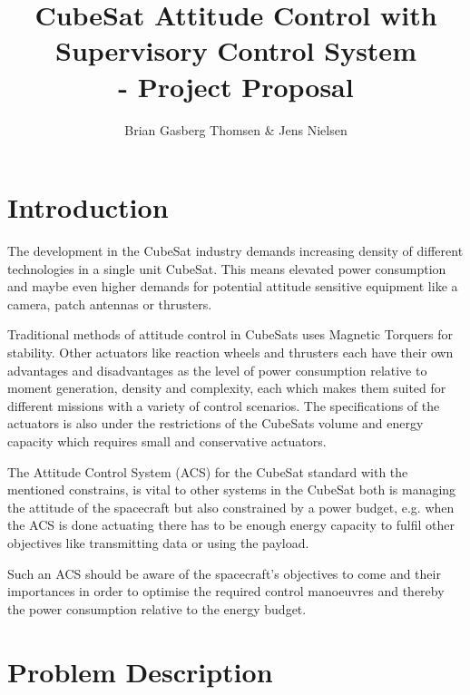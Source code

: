 \documentclass[10pt,a4paper,oneside,openany,article]{memoir}
\title{\vspace{-2cm} CubeSat Attitude Control with Supervisory Control System \\ \Large - Project Proposal}
\author{Brian Gasberg Thomsen \& Jens Nielsen}
\begin{document}
\maketitle

\chapter{Introduction}
The development in the CubeSat industry demands increasing density of different technologies in a single unit CubeSat. This means elevated power consumption and maybe even higher demands for potential attitude sensitive equipment like a camera, patch antennas or thrusters. 

Traditional methods of attitude control in CubeSats uses Magnetic Torquers for stability. Other actuators like reaction wheels and thrusters each have their own advantages and disadvantages as the level of power consumption relative to moment generation, density and complexity, each which makes them suited for different missions with a variety of control scenarios. The specifications of the actuators is also under the restrictions of the CubeSats volume and energy capacity which requires small and conservative actuators.

The Attitude Control System (ACS) for the CubeSat standard with the mentioned constrains, is vital to other systems in the CubeSat both is managing the attitude of the spacecraft but also constrained by a power budget, e.g. when the ACS is done actuating there has to be enough energy capacity to fulfil other objectives like transmitting data or using the payload.

Such an ACS should be aware of the spacecraft's objectives to come and their importances in order to optimise the required control manoeuvres and thereby the power consumption relative to the energy budget.

\chapter{Problem Description}

\end{document}
